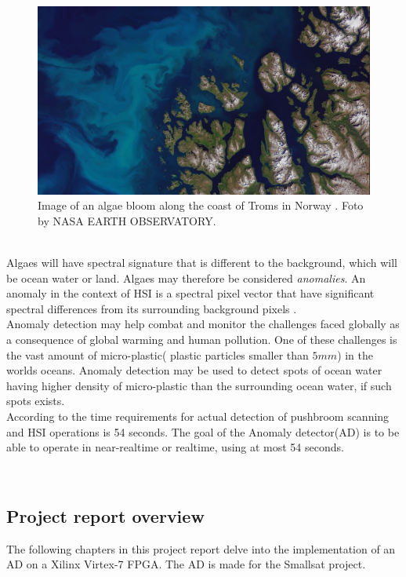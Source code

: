 \begin{figure}[H]
\centering
   \includegraphics[scale=0.3]{images/algaes/algaes_northern_troms.jpg}
  \caption{ Image of an algae bloom along the coast of Troms in Norway \cite{laksedeath}. Foto by NASA EARTH OBSERVATORY. } 
  \label{fig:algae_bloom_troms}
\end{figure}
\\

Algaes will have spectral signature that is different to the background, which will be ocean water or land. Algaes may therefore be considered \textit{anomalies}. An anomaly in the context of HSI is a spectral pixel vector that have significant spectral differences from its surrounding background pixels \cite{yang2015dual}.  
\\

Anomaly detection may help combat and monitor the challenges faced globally as a consequence of global warming and human pollution. One of these challenges is the vast amount of micro-plastic( plastic particles smaller than $5mm$) in the worlds oceans. Anomaly detection may be used to detect spots of ocean water having higher density of micro-plastic than the surrounding ocean water, if such spots exists.       \\


According to \cite{SmallSat_project_description} the time requirements for actual detection of pushbroom scanning and HSI operations is 54 seconds. The goal of the Anomaly detector(AD) is to be able to operate in near-realtime or realtime, using at most 54 seconds. 


\\






\newpage
\subsection{Project report overview}
The following chapters in this project report delve into the implementation of an AD on a Xilinx Virtex-7 FPGA. The AD is made for the Smallsat project. \\  

